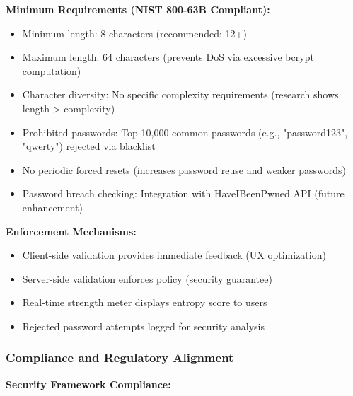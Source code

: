 \documentclass[12pt,a4paper]{article}
\begin{document}
\begin{tcolorbox}[colback=lightgray, colframe=secondaryblue, boxrule=0.8pt, arc=3pt]

\textbf{Minimum Requirements (NIST 800-63B Compliant):}

\begin{itemize}[leftmargin=2em, itemsep=5pt]
    \item Minimum length: 8 characters (recommended: 12+)
    \item Maximum length: 64 characters (prevents DoS via excessive bcrypt computation)
    \item Character diversity: No specific complexity requirements (research shows length > complexity)
    \item Prohibited passwords: Top 10,000 common passwords (e.g., "password123", "qwerty") rejected via blacklist
    \item No periodic forced resets (increases password reuse and weaker passwords)
    \item Password breach checking: Integration with HaveIBeenPwned API (future enhancement)
\end{itemize}

\textbf{Enforcement Mechanisms:}

\begin{itemize}[leftmargin=2em, itemsep=5pt]
    \item Client-side validation provides immediate feedback (UX optimization)
    \item Server-side validation enforces policy (security guarantee)
    \item Real-time strength meter displays entropy score to users
    \item Rejected password attempts logged for security analysis
\end{itemize}

\end{tcolorbox}

\subsubsection{Compliance and Regulatory Alignment}

\textbf{Security Framework Compliance:}
\end{document}
